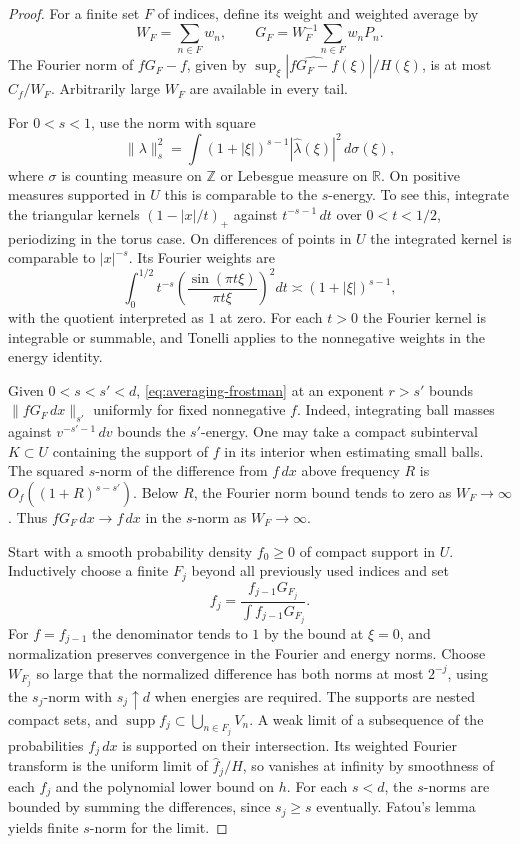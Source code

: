 \documentclass[11pt,a4paper,reqno]{amsart}
\theoremstyle{definition}
\theoremstyle{remark}
\numberwithin{equation}{section}
\begin{document}
\begin{proof}
For a finite set \(F\) of indices, define its weight and weighted average by
\[
     W_F=\sum_{n\in F}w_n,\qquad G_F=W_F^{-1}\sum_{n\in F}w_nP_n .
\]
The Fourier norm of \(fG_F-f\), given by
\(\sup_\xi |\widehat{fG_F-f}(\xi)|/H(\xi)\), is at most \(C_f/W_F\).
Arbitrarily large \(W_F\) are available in every tail.

For \(0<s<1\), use the norm with square
\[
  \|\lambda\|_s^2=\int(1+|\xi|)^{s-1}|\widehat\lambda(\xi)|^2\,d\sigma(\xi),
\]
where \(\sigma\) is counting measure on \(\mathbb Z\) or Lebesgue measure on \(\mathbb R\). On positive measures supported in \(U\) this is comparable to the \(s\)-energy. To see this, integrate the triangular kernels \((1-|x|/t)_+\) against \(t^{-s-1}\,dt\) over \(0<t<1/2\), periodizing in the torus case. On differences of points in \(U\) the integrated kernel is comparable to \(|x|^{-s}\). Its Fourier weights are
\[
  \int_0^{1/2}t^{-s}\left(\frac{\sin(\pi t\xi)}{\pi t\xi}\right)^2dt
     \asymp (1+|\xi|)^{s-1},
\]
with the quotient interpreted as \(1\) at zero. For each \(t>0\) the Fourier kernel is integrable or summable, and Tonelli applies to the nonnegative weights in the energy identity.

Given \(0<s<s'<d\), \eqref{eq:averaging-frostman} at an exponent \(r>s'\) bounds \(\|fG_F\,dx\|_{s'}\) uniformly for fixed nonnegative \(f\). Indeed, integrating ball masses against \(v^{-s'-1}\,dv\) bounds the \(s'\)-energy. One may take a compact subinterval \(K\subset U\) containing the support of \(f\) in its interior when estimating small balls. The squared \(s\)-norm of the difference from \(f\,dx\) above frequency \(R\) is \(O_f((1+R)^{s-s'})\). Below \(R\), the Fourier norm bound tends to zero as \(W_F\to\infty\). Thus \(fG_F\,dx\to f\,dx\) in the \(s\)-norm as \(W_F\to\infty\).

Start with a smooth probability density \(f_0\ge0\) of compact support in \(U\). Inductively choose a finite \(F_j\) beyond all previously used indices and set
\[
 f_j=\frac{f_{j-1}G_{F_j}}{\int f_{j-1}G_{F_j}} .
\]
For \(f=f_{j-1}\) the denominator tends to \(1\) by the bound at \(\xi=0\), and normalization preserves convergence in the Fourier and energy norms. Choose \(W_{F_j}\) so large that the normalized difference has both norms at most \(2^{-j}\), using the \(s_j\)-norm with \(s_j\uparrow d\) when energies are required. The supports are nested compact sets, and \(\operatorname{supp} f_j\subset \bigcup_{n\in F_j}V_n\). A weak limit of a subsequence of the probabilities \(f_j\,dx\) is supported on their intersection. Its weighted Fourier transform is the uniform limit of \(\widehat f_j/H\), so vanishes at infinity by smoothness of each \(f_j\) and the polynomial lower bound on \(h\). For each \(s<d\), the \(s\)-norms are bounded by summing the differences, since \(s_j\ge s\) eventually. Fatou's lemma yields finite \(s\)-norm for the limit.


\end{proof}
\end{document}
